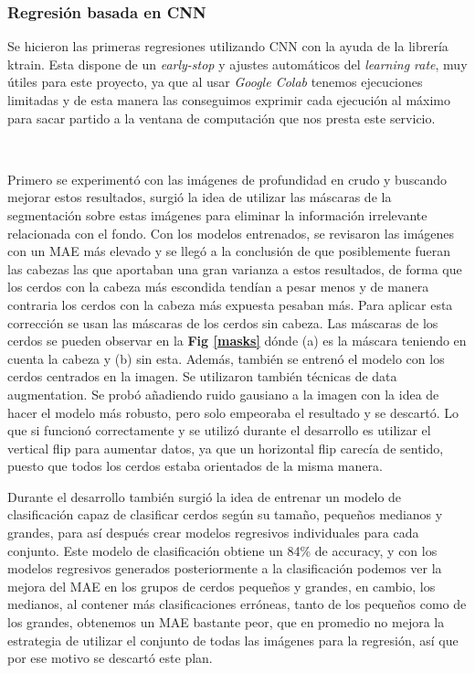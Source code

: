 ﻿\documentclass[10pt,a4paper,twocolumn,twoside]{article}
\begin{document}
\subsubsection{Regresión basada en CNN}
Se hicieron las primeras regresiones utilizando CNN con la ayuda de la librería ktrain\cite{ktrain}. Esta dispone de un \textit{early-stop} y ajustes automáticos del \textit{learning rate}, muy útiles para este proyecto, ya que al usar \textit{Google Colab} tenemos ejecuciones limitadas y de esta manera las conseguimos exprimir cada ejecución al máximo para sacar partido a la ventana de computación que nos presta este servicio.
\begin{figure*}[!]
 \centering
 \
 \caption{Máscaras generadas por Segmentación semántica}%
 \label{masks}%
\end{figure*}
Primero se experimentó con las imágenes de profundidad en crudo y buscando mejorar estos resultados, surgió la idea de utilizar las máscaras de la segmentación sobre estas imágenes para eliminar la información irrelevante relacionada con el fondo.
Con los modelos entrenados, se revisaron las imágenes con un MAE\cite{mae} más elevado y se llegó a la conclusión de que posiblemente fueran las cabezas las que aportaban una gran varianza a estos resultados, de forma que los cerdos con la cabeza más escondida tendían a pesar menos y de manera contraria los cerdos con la cabeza más expuesta pesaban más. Para aplicar esta corrección se usan las máscaras de los cerdos sin cabeza. Las máscaras de los cerdos se pueden observar en la \textbf{Fig \ref{masks}} dónde (a) es la máscara teniendo en cuenta la cabeza y (b) sin esta.
Además, también se entrenó el modelo con los cerdos centrados en la imagen.
Se utilizaron también técnicas de data augmentation. Se probó añadiendo ruido gausiano a la imagen con la idea de hacer el modelo más robusto, pero solo empeoraba el resultado y se descartó. Lo que si funcionó correctamente y se utilizó durante el desarrollo es utilizar el vertical flip para aumentar datos, ya que un horizontal flip carecía de sentido, puesto que todos los cerdos estaba orientados de la misma manera.

Durante el desarrollo también surgió la idea de entrenar un modelo de clasificación capaz de clasificar cerdos según su tamaño, pequeños medianos y grandes, para así después crear modelos regresivos individuales para cada conjunto. Este modelo de clasificación obtiene un 84\% de accuracy, y con los modelos regresivos generados posteriormente a la clasificación podemos ver la mejora del MAE en los grupos de cerdos pequeños y grandes, en cambio, los medianos, al contener más clasificaciones erróneas, tanto de los pequeños como de los grandes, obtenemos un MAE bastante peor, que en promedio no mejora la estrategia de utilizar el conjunto de todas las imágenes para la regresión, así que por ese motivo se descartó este plan.
\end{document}
